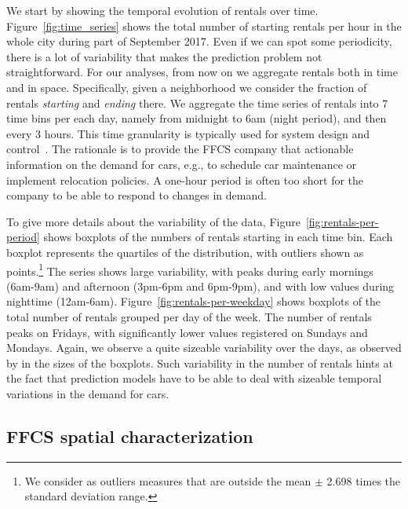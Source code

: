 We start by showing the temporal evolution of rentals over time.  Figure~\ref{fig:time_series} shows the total number of starting rentals per hour in the whole city during part of September 2017. Even if we can spot some periodicity, there is a lot of variability that makes the prediction problem not straightforward. 
For our analyses, from now on we aggregate rentals both in time  and in space. Specifically, given a neighborhood we consider the fraction of rentals \textit{starting} and \textit{ending} there. We aggregate the time series of rentals into 7 time bins per each day, namely from midnight to 6am (night period), and then every 3 hours. 
This time granularity is typically used for system design and control~\citep{schmoller2015empirical}. The rationale is to provide the FFCS company that actionable information on the demand for cars, e.g., to schedule car maintenance or implement relocation policies. A one-hour period is often too short for the company to be able to respond to changes in demand.

To give more details about the variability of the data, Figure~\ref{fig:rentals-per-period} shows boxplots of the  numbers of rentals starting in each time bin. 
Each boxplot represents the quartiles of the distribution, with outliers shown as points.\footnote{We consider as outliers measures that are outside the mean $\pm$ 2.698 times the standard deviation range.} 
The series shows large variability, with peaks during early mornings (6am-9am) and afternoon (3pm-6pm and 6pm-9pm), and with low values during nighttime (12am-6am). 
Figure~\ref{fig:rentals-per-weekday} shows boxplots of the total number of rentals grouped per day of the week. The number of rentals peaks on Fridays, with significantly lower values registered on Sundays and Mondays. 
Again, we observe a quite sizeable variability over the days, as observed by in the sizes of the boxplots. 
Such variability in the number of rentals hints at the fact that prediction models have to be able to deal with sizeable temporal variations in the demand for cars.

\subsection{FFCS spatial characterization}


